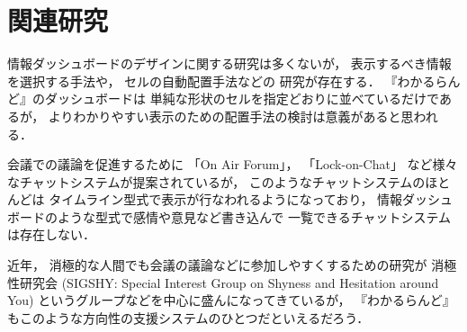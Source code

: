 \section{関連研究}

情報ダッシュボードのデザイン\cite{few}に関する研究は多くないが，
表示するべき情報を選択する手法\cite{Jones:2015:ECI:2800835.2800963}や，
セルの自動配置手法\cite{Hertzog:2015:BSP:2678025.2701383}などの
研究が存在する．
『わかるらんど』のダッシュボードは
単純な形状のセルを指定どおりに並べているだけであるが，
よりわかりやすい表示のための配置手法の検討は意義があると思われる．

会議での議論を促進するために
「On Air Forum」\cite{nishida2011}，
「Lock-on-Chat」\cite{nishida2006}
など様々なチャットシステムが提案されているが，
このようなチャットシステムのほとんどは
タイムライン型式で表示が行なわれるようになっており，
情報ダッシュボードのような型式で感情や意見など書き込んで
一覧できるチャットシステムは存在しない．

近年，
消極的な人間でも会議の議論などに参加しやすくするための研究が
消極性研究会 (SIGSHY: Special Interest Group on Shyness and Hesitation around You)
というグループなどを中心に盛んになってきているが\cite{kurihara2016}\cite{nishida2011}，
『わかるらんど』もこのような方向性の支援システムのひとつだといえるだろう．

% 
% 
% 
